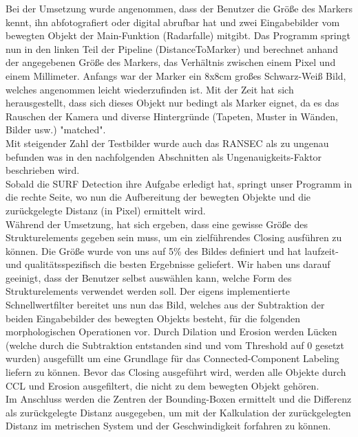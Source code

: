 \documentclass[deutsch]{scrartcl}
\begin{document}
Bei der Umsetzung wurde angenommen, dass der Benutzer die Größe des Markers kennt, ihn abfotografiert oder digital abrufbar hat und zwei Eingabebilder vom bewegten Objekt der Main-Funktion (Radarfalle) mitgibt. Das Programm springt nun in den linken Teil der Pipeline (DistanceToMarker) und berechnet anhand der angegebenen Größe des Markers, das Verhältnis zwischen einem Pixel und einem Millimeter. Anfangs war der Marker ein 8x8cm großes Schwarz-Weiß Bild, welches angenommen leicht wiederzufinden ist. Mit der Zeit hat sich herausgestellt, dass sich dieses Objekt nur bedingt als Marker eignet, da es das Rauschen der Kamera und diverse Hintergründe (Tapeten, Muster in Wänden, Bilder usw.) "matched".\\
Mit steigender Zahl der Testbilder wurde auch das RANSEC als zu ungenau befunden was in den nachfolgenden Abschnitten als Ungenauigkeits-Faktor beschrieben wird.\\

Sobald die SURF Detection ihre Aufgabe erledigt hat, springt unser Programm in die rechte Seite, wo nun die Aufbereitung der bewegten Objekte und die zurückgelegte Distanz (in Pixel) ermittelt wird.\\
Während der Umsetzung, hat sich ergeben, dass eine gewisse Größe des Strukturelements gegeben sein muss, um ein zielführendes Closing ausführen zu können. Die Größe wurde von uns auf 5\% des Bildes definiert und hat laufzeit- und qualitätsspezifisch die besten Ergebnisse geliefert. Wir haben uns darauf geeinigt, dass der Benutzer selbst auswählen kann, welche Form des Strukturelements verwendet werden soll. Der eigens implementierte Schnellwertfilter bereitet uns nun das Bild, welches aus der Subtraktion der beiden Eingabebilder des bewegten Objekts besteht, für die folgenden morphologischen Operationen vor. Durch Dilation und Erosion werden Lücken (welche durch die Subtraktion entstanden sind und vom Threshold auf 0 gesetzt wurden) ausgefüllt um eine Grundlage für das Connected-Component Labeling liefern zu können. Bevor das Closing ausgeführt wird, werden alle Objekte durch CCL und Erosion ausgefiltert, die nicht zu dem bewegten Objekt gehören.\\

Im Anschluss werden die Zentren der Bounding-Boxen ermittelt und die Differenz als zurückgelegte Distanz ausgegeben, um mit der Kalkulation der zurückgelegten Distanz im metrischen System und der Geschwindigkeit forfahren zu können.


\end{document}
